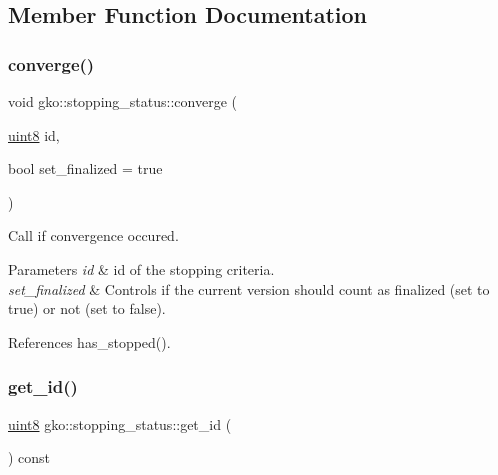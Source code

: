 \subsection{Member Function Documentation}
\mbox{\label{classgko_1_1stopping__status_a611bf8c81a8e3b22bab8f19ff68e8a12}} 
\subsubsection{\texorpdfstring{converge()}{converge()}}
{\footnotesize\ttfamily void gko\+::stopping\+\_\+status\+::converge (\begin{DoxyParamCaption}\item[{\hyperlink{namespacegko_a3950fc3732811a8563484e5098c31531}{uint8}}]{id,  }\item[{bool}]{set\+\_\+finalized = {\ttfamily true} }\end{DoxyParamCaption})\hspace{0.3cm}{\ttfamily [noexcept]}}



Call if convergence occured. 


\begin{DoxyParams}{Parameters}
{\em id} & id of the stopping criteria. \\
\hline
{\em set\+\_\+finalized} & Controls if the current version should count as finalized (set to true) or not (set to false). \\
\hline
\end{DoxyParams}


References has\+\_\+stopped().

\mbox{\label{classgko_1_1stopping__status_ae3c4d0e7a01f4e1892a09f418ea0907d}} 
\subsubsection{\texorpdfstring{get\+\_\+id()}{get\_id()}}
{\footnotesize\ttfamily \hyperlink{namespacegko_a3950fc3732811a8563484e5098c31531}{uint8} gko\+::stopping\+\_\+status\+::get\+\_\+id (\begin{DoxyParamCaption}{ }\end{DoxyParamCaption}) const\hspace{0.3cm}{\ttfamily [noexcept]}}



